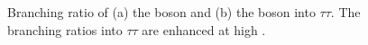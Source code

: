 \begin{figure}[h!]
\begin{center}
\end{center}
\caption[Branching ratio of the \PHiggs and \PHiggsps bosons into $\tau\tau$.]{Branching ratio of (a) the \PHiggs boson and (b) the \PHiggsps boson into $\tau\tau$. The branching
ratios into $\tau\tau$ are enhanced at high \tanb.}
\label{fig:mhmodp_br}
\end{figure}



